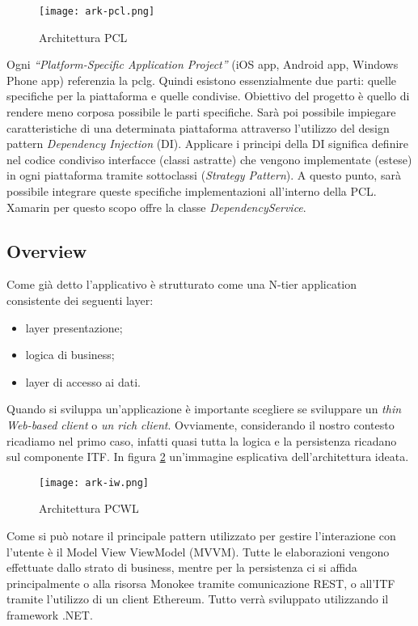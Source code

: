 \begin{figure}[!h]
    
    \centering
    \texttt{[image: ark-pcl.png]} 
    \caption{Architettura PCL}
    \label{fig:ark-pcl} 
\end{figure}

Ogni \emph{“Platform-Specific Application Project”} (iOS app, Android app, Windows Phone app) referenzia la \gls{pclg}. Quindi esistono essenzialmente due parti: quelle specifiche per la piattaforma e quelle condivise. Obiettivo del progetto è quello di rendere meno corposa possibile le parti specifiche. Sarà poi possibile impiegare caratteristiche di una determinata piattaforma attraverso l’utilizzo del design pattern \emph{Dependency Injection} (DI).
Applicare i principi della DI significa definire nel codice condiviso interfacce (classi astratte) che vengono implementate (estese) in ogni piattaforma tramite sottoclassi (\emph{Strategy Pattern}). A questo punto, sarà possibile integrare queste specifiche implementazioni all’interno della PCL. Xamarin per questo scopo offre la classe \emph{DependencyService}.


\subsection{Overview}
Come già detto l’applicativo è strutturato come una N-tier application consistente dei seguenti layer:
\begin{itemize}
    \item layer presentazione;
    \item logica di business;
    \item layer di accesso ai dati. 
\end{itemize}
    
Quando si sviluppa un’applicazione è importante scegliere se sviluppare un \emph{thin Web-based client} o \emph{un rich client}. Ovviamente, considerando il nostro contesto ricadiamo nel primo caso, infatti quasi tutta la logica e la persistenza ricadano sul componente ITF. In figura \ref{fig:ark-iw} un'immagine esplicativa dell'architettura ideata.
\begin{figure}[htbp]
    
    \centering
    \texttt{[image: ark-iw.png]} 
    \caption{Architettura PCWL}
    \label{fig:ark-iw} 
\end{figure}
Come si può notare il principale pattern utilizzato per gestire l’interazione con l’utente è il Model View ViewModel (MVVM). Tutte le elaborazioni vengono effettuate dallo strato di business, mentre per la persistenza ci si affida principalmente o alla risorsa Monokee tramite comunicazione REST, o all’ITF tramite l’utilizzo di un client Ethereum. Tutto verrà sviluppato utilizzando il framework .NET.
